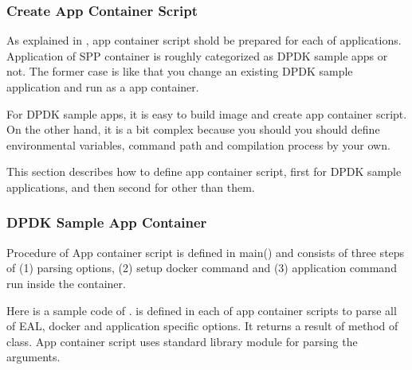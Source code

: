 \documentclass[a4paper,11pt,openany,oneside,english]{sphinxmanual}
\begin{document}
\subsubsection{Create App Container Script}
\label{\detokenize{tools/sppc/howto_launcher:create-app-container-script}}\label{\detokenize{tools/sppc/howto_launcher:sppc-howto-create-appc}}
As explained in {\hyperref[\detokenize{tools/sppc/app_launcher:spp-container-app-launcher}]{}}, app container script
shold be prepared for each of applications.
Application of SPP container is roughly categorized as DPDK sample apps
or not. The former case is like that you change an existing DPDK sample
application and run as a app container.

For DPDK sample apps, it is easy to build image and create app container
script.
On the other hand, it is a bit complex because you should you should
define environmental variables, command path and compilation process by
your own.

This section describes how to define app container script,
first for DPDK sample applications,
and then second for other than them.


\subsubsection{DPDK Sample App Container}
\label{\detokenize{tools/sppc/howto_launcher:dpdk-sample-app-container}}\label{\detokenize{tools/sppc/howto_launcher:sppc-howto-dpdk-sample-appc}}
Procedure of App container script is defined in main() and
consists of three steps of
(1) parsing options, (2) setup docker command and
(3) application command run inside the container.

Here is a sample code of {\hyperref[\detokenize{tools/sppc/app_launcher:sppc-appl-l2fwd}]{}}.
 is defined in each
of app container scripts to parse all of EAL, docker and application
specific options.
It returns a result of  method of
 class.
App container script uses standard library module 
for parsing the arguments.
\end{document}

